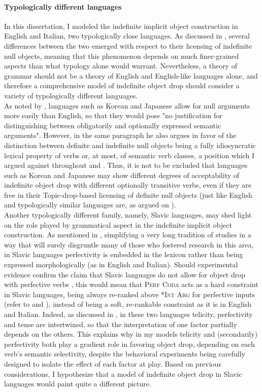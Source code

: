 \paragraph{Typologically different languages}
In this dissertation, I modeled the indefinite implicit object construction in English and Italian, two typologically close languages. As discussed in , several differences between the two emerged with respect to their licensing of indefinite null objects, meaning that this phenomenon depends on much finer-grained aspects than what typology alone would warrant. Nevertheless, a theory of grammar should not be a theory of English and English-like languages alone, and therefore a comprehensive model of indefinite object drop should consider a variety of typologically different languages.\\
As noted by \textcite[134]{Jackendoff2003}, languages such as Korean and Japanese allow for null arguments more easily than English, so that they would pose "no justiﬁcation for distinguishing between obligatorily and optionally expressed semantic arguments". However, in the same paragraph he also argues in favor of the distinction between definite and indefinite null objects being a fully idiosyncratic lexical property of verbs or, at most, of semantic verb classes, a position which I argued against throughout  and . Thus, it is not to be excluded that languages such as Korean and Japanese may show different degrees of acceptability of indefinite object drop with different optionally transitive verbs, even if they are free in their Topic-drop-based licensing of definite null objects (just like English and typologically similar languages are, as argued on ).\\
Another typologically different family, namely, Slavic languages, may shed light on the role played by grammatical aspect in the indefinite implicit object construction. As mentioned in , simplifying a very long tradition of studies in a way that will surely disgruntle many of those who fostered research in this area, in Slavic languages perfectivity is embedded in the lexicon rather than being expressed morphologically (as in English and Italian). Should experimental evidence confirm the claim that Slavic languages do not allow for object drop with perfective verbs \parencite{sopata2016null, TsimpliPapadopoulou2006}, this would mean that \textsc{Perf Coda} acts as a hard constraint in Slavic languages, being always re-ranked above \textsc{*Int Arg} for perfective inputs (refer to  and ), instead of being a soft, re-rankable constraint as it is in English and Italian. Indeed, as discussed in , in these two languages telicity, perfectivity and tense are intertwined, so that the interpretation of one factor partially depends on the others. This explains why in my models telicity and (secondarily) perfectivity both play a gradient role in favoring object drop, depending on each verb's semantic selectivity, despite the behavioral experiments being carefully designed to isolate the effect of each factor at play. Based on previous considerations, I hypothesize that a model of indefinite object drop in Slavic languages would paint quite a different picture.
